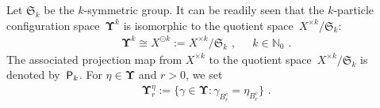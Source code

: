 \documentclass[11pt,letterpaper]{amsart}
\newcommand{\T}{\tau} %
\newcommand{\A}{\Sigma} %
\DeclareMathOperator{\eqdef}{\coloneqq}
\newcommand{\set}[1]{\left\{#1\right\}}							%
\newcommand{\sym}[1]{{\scriptscriptstyle{(#1)}}}
\newcommand{\Cz}{\mcC_0}									%
\newcommand{\N}{{\mathbb N}}
\newcommand{\iref}[1]{\ref{#1}}
\newcommand{\comma}{\,\,\mathrm{,}\;\,}
\newcommand{\fstop}{\,\,\mathrm{.}}
\newcommand{\dUpsilon}{{\mathbf \Upsilon}}
\newcommand{\U}{\dUpsilon}
\renewcommand{\1}{\mathbf 1}
\renewcommand{\msE}{\mathscr K}
\numberwithin{equation}{section}
\theoremstyle{plain}
\theoremstyle{definition}
\newtheorem{defs}[thm]{Definition}%
\theoremstyle{remark}
\newcommand{\quot}{{\sf P}}
\begin{document}
Let $\mathfrak S_k$ be the $k$-symmetric group. It can be readily seen that the $k$-particle configuration space~$\U^k$ is isomorphic to the quotient space~$X^{\times k}/\mathfrak S_k$:
\begin{align} \label{e:STS}
\dUpsilon^k\cong X^{\odot k}:=X^{\times k}/\mathfrak S_k \comma \quad k \in \N_0\fstop
\end{align}
The associated projection map from $X^{\times k}$ to the quotient space~$X^{\times k}/\mathfrak S_k$ is denoted by~$\quot_k$. 
For $\eta \in \U$ and $r>0$, we set 
\begin{align} \label{e:CES}
\U_r^\eta:=\{\gamma \in \U: \gamma_{B_r^c}=\eta_{B_r^c}\} \fstop
\end{align}


\end{document}
